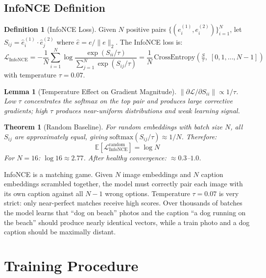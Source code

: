 \documentclass[12pt, a4paper]{article}
\theoremstyle{definition}
\newtheorem{definition}{Definition}[section]
\theoremstyle{plain}
\newtheorem{theorem}{Theorem}[section]
\newtheorem{lemma}{Lemma}[section]
\theoremstyle{remark}
\begin{document}
\subsection{InfoNCE Definition}

\begin{definition}[InfoNCE Loss]
Given $N$ positive pairs $\{(e_i^{(1)}, e_i^{(2)})\}_{i=1}^N$, let
$S_{ij} = \hat{e}_i^{(1)}\cdot\hat{e}_j^{(2)}$ where $\hat{e} = e/\|e\|_2$.
The InfoNCE loss is:
\[
  \mathcal{L}_{\mathrm{InfoNCE}} =
  -\frac{1}{N}\sum_{i=1}^{N}\log
  \frac{\exp(S_{ii}/\tau)}{\sum_{j=1}^{N}\exp(S_{ij}/\tau)}
  = \frac{1}{N}\,\mathrm{CrossEntropy}\!\left(\tfrac{S}{\tau},\;[0,1,\ldots,N{-}1]\right)
\]
with temperature $\tau = 0.07$.
\end{definition}

\begin{lemma}[Temperature Effect on Gradient Magnitude]
$\left\|\partial\mathcal{L}/\partial S_{ii}\right\| \propto 1/\tau$.
Low $\tau$ concentrates the softmax on the top pair and produces large
corrective gradients; high $\tau$ produces near-uniform distributions
and weak learning signal.
\end{lemma}

\begin{theorem}[Random Baseline]
For random embeddings with batch size $N$, all $S_{ij}$ are
approximately equal, giving $\mathrm{softmax}(S_{ij}/\tau) \approx 1/N$.
Therefore:
\[
  \mathbb{E}[\mathcal{L}_{\mathrm{InfoNCE}}^{\mathrm{random}}] = \log N
\]
For $N=16$: $\log 16 \approx 2.77$.  After healthy convergence: $\approx 0.3$--$1.0$.
\end{theorem}

\begin{tcolorbox}[layman]
InfoNCE is a matching game.  Given $N$ image embeddings and $N$ caption
embeddings scrambled together, the model must correctly pair each image
with its own caption against all $N-1$ wrong options.  Temperature
$\tau=0.07$ is very strict: only near-perfect matches receive high scores.
Over thousands of batches the model learns that ``dog on beach'' photos
and the caption ``a dog running on the beach'' should produce nearly
identical vectors, while a train photo and a dog caption should be
maximally distant.
\end{tcolorbox}

\section{Training Procedure}
\label{sec:training}
\end{document}
